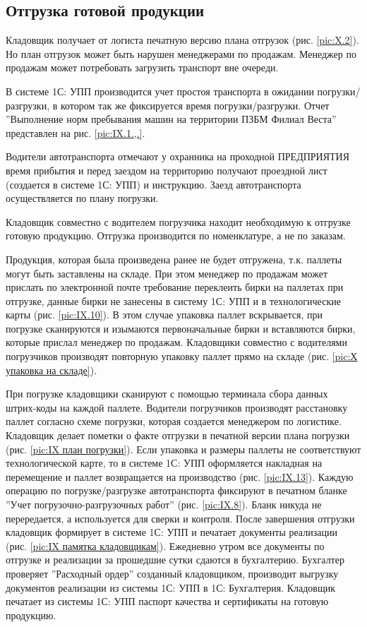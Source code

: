 \newpage
\subsection{Отгрузка готовой продукции}
\label{bp:Shipment}

Кладовщик получает от логиста печатную версию плана отгрузок (рис. \ref{pic:X.2}). Но план отгрузок может быть нарушен менеджерами по продажам. Менеджер по продажам может потребовать загрузить транспорт вне очереди. 

В системе 1С: УПП производится учет простоя транспорта в ожидании погрузки/разгрузки, в котором так же фиксируется время погрузки/разгрузки.  Отчет ''Выполнение норм пребывания машин на территории ПЗБМ Филиал Веста'' представлен на рис. \ref{pic:IX.1.,.}.

Водители автотранспорта отмечают у охранника на проходной ПРЕДПРИЯТИЯ время прибытия и перед заездом на территорию получают проездной лист (создается в системе 1С: УПП) и инструкцию.
Заезд автотранспорта осуществляется по плану погрузки.

Кладовщик совместно с водителем погрузчика находит необходимую к отгрузке готовую продукцию. Отгрузка производится по номенклатуре, а не по заказам. 

Продукция, которая была произведена ранее не будет отгружена, т.к. паллеты могут быть заставлены на складе. При этом менеджер по продажам может прислать по электронной почте требование переклеить бирки на паллетах при отгрузке, данные бирки не занесены в систему 1С: УПП и в технологические карты (рис. \ref{pic:IX.10}). В этом случае упаковка паллет вскрывается, при погрузке сканируются и изымаются первоначальные бирки и вставляются бирки, которые прислал менеджер по продажам. Кладовщики совместно с водителями погрузчиков производят повторную упаковку паллет прямо на складе (рис. \ref{pic:Х упаковка на складе}). 

При погрузке кладовщики сканируют с помощью терминала сбора данных штрих-коды  на каждой паллете. Водители погрузчиков производят расстановку паллет согласно схеме погрузки, которая создается менеджером по логистике. Кладовщик делает пометки о факте отгрузки в печатной версии плана погрузки (рис. \ref{pic:IX план погрузки}). Если упаковка и размеры паллеты не соответствуют технологической карте, то в системе 1С: УПП оформляется накладная на перемещение и паллет возвращается на производство (рис. \ref{pic:IX.13}).   Каждую операцию по погрузке/разгрузке автотранспорта фиксируют в печатном бланке ''Учет погрузочно-разгрузочных работ'' (рис. \ref{pic:IX.8}). Бланк никуда не перередается, а используется для сверки и контроля. После завершения отгрузки кладовщик формирует в системе 1С: УПП и печатает документы реализации (рис. \ref{pic:IX памятка кладовщикам}).
Ежедневно утром все документы по отгрузке и реализации за прошедшие сутки сдаются в бухгалтерию. Бухгалтер проверяет ''Расходный ордер'' созданный кладовщиком, производит выгрузку документов реализации из системы 1С: УПП в 1С: Бухгалтерия.  
Кладовщик печатает из системы 1С: УПП паспорт качества и сертификаты на готовую продукцию.


